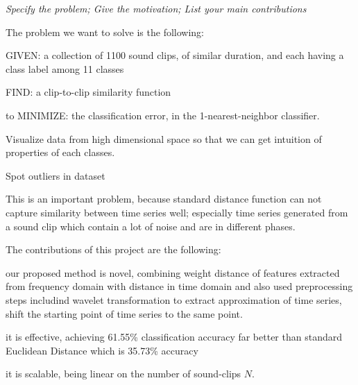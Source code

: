 {\small \em Specify the problem; Give the motivation; 
List your main contributions}

The problem we want to solve is the following:
\bit
\item GIVEN: a collection of 1100 sound clips, of similar duration,
      and each having a class label among 11 classes
\item FIND: a clip-to-clip similarity function
\item to MINIMIZE: the classification error, in the 1-nearest-neighbor
      classifier.
\item Visualize data from high dimensional space so that we can get intuition of properties of each classes.
\item Spot outliers in dataset
\eit

This is an important problem, because standard distance function can not capture similarity between time series well; especially time series generated from a sound clip which contain a lot of noise and are in different phases.

The contributions of this project are the following:
\bit
\item our proposed method is novel, combining weight distance of features extracted from frequency domain with distance in time domain and also used preprocessing steps includind wavelet transformation to extract approximation of time series, shift the starting point of time series to the same point.
\item it is effective, achieving 61.55\% classification accuracy far better than standard Euclidean Distance which is 35.73\% accuracy
\item it is scalable, being linear on the number of sound-clips $N$.
\eit
